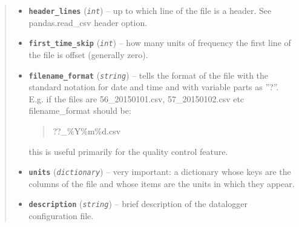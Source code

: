 \documentclass[a4paper,10pt,oneside]{sphinxmanual}
\begin{document}
\begin{fulllineitems}
\begin{quote}
\begin{description}
\begin{itemize}
\item {} 
\textbf{\texttt{header\_lines}} (\emph{\texttt{int}}) -- up to which line of the file is a header. See pandas.read\_csv header option.

\item {} 
\textbf{\texttt{first\_time\_skip}} (\emph{\texttt{int}}) -- how many units of frequency the first line of the file is offset (generally zero).

\item {} 
\textbf{\texttt{filename\_format}} (\emph{\texttt{string}}) -- 
tells the format of the file with the standard notation for date and time and with variable
parts as ''?''. E.g. if the files are 56\_20150101.csv, 57\_20150102.csv etc filename\_format should be:
\begin{quote}

??\_\%Y\%m\%d.csv
\end{quote}

this is useful primarily for the quality control feature.


\item {} 
\textbf{\texttt{units}} (\emph{\texttt{dictionary}}) -- very important: a dictionary whose keys are the columns of the file and whose items are
the units in which they appear.

\item {} 
\textbf{\texttt{description}} (\emph{\texttt{string}}) -- brief description of the datalogger configuration file.

\end{itemize}

\end{description}\end{quote}

\end{fulllineitems}

\end{document}
